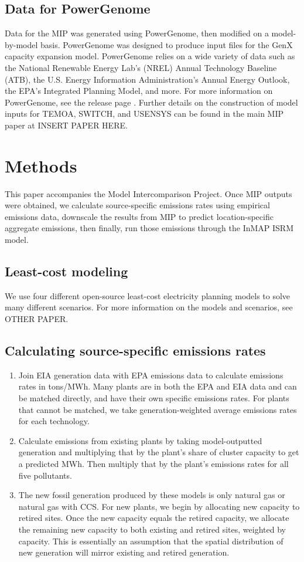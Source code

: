 \documentclass[a4paper]{article}
\theoremstyle{definition}
\theoremstyle{plain}
\begin{document}
\subsection{Data for PowerGenome}
Data for the MIP was generated using PowerGenome, then modified on a model-by-model basis.  PowerGenome was designed to produce input files for the GenX capacity expansion model.  PowerGenome relies on a wide variety of data such as the National Renewable Energy Lab's (NREL) Annual Technology Baseline (ATB), the U.S. Energy Information Administration's Annual Energy Outlook, the EPA's Integrated Planning Model, and more.  For more information on PowerGenome, see the release page \citep{PowerGenome/PowerGenome:V0.6.3}.  Further details on the construction of model inputs for TEMOA, SWITCH, and USENSYS can be found in the main MIP paper at INSERT PAPER HERE.

\section{Methods}
This paper accompanies the Model Intercomparison Project. Once MIP outputs were obtained, we calculate source-specific emissions rates using empirical emissions data, downscale the results from MIP to predict location-specific aggregate emissions, then finally, run those emissions through the InMAP ISRM model. 


\subsection{Least-cost modeling}
We use four different open-source least-cost electricity planning models to solve many different scenarios. For more information on the models and scenarios, see OTHER PAPER.


\subsection{Calculating source-specific emissions rates}
\begin{enumerate}
    \item Join EIA generation data with EPA emissions data to calculate emissions rates in tons/MWh.  Many plants are in both the EPA and EIA data and can be matched directly, and have their own specific emissions rates.  For plants that cannot be matched, we take generation-weighted average emissions rates for each technology.
    \item Calculate emissions from existing plants by taking model-outputted generation and multiplying that by the plant's share of cluster capacity to get a predicted MWh.  Then multiply that by the plant's emissions rates for all five pollutants.
    \item The new fossil generation produced by these models is only natural gas or natural gas with CCS.  For new plants, we begin by allocating new capacity to retired sites.  Once the new capacity equals the retired capacity, we allocate the remaining new capacity to both existing and retired sites, weighted by capacity.  This is essentially an assumption that the spatial distribution of new generation will mirror existing and retired generation.  
\end{enumerate}
\end{document}
